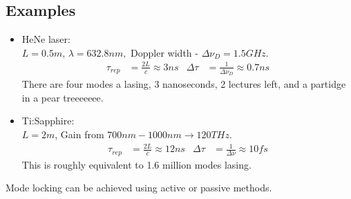 \documentclass[a4paper, 11pt, normalem]{report}
\begin{document}
\subsection{Examples}
\begin{itemize}
    \item HeNe laser:\\
        $L=0.5m,\,\lambda = 632.8nm,$ Doppler width - $\Delta\nu_D = 1.5GHz$.
        \begin{align}
            \tau_{rep} &= \frac{2L}{c} \approx 3ns &
            \Delta\tau &= \frac{1}{\Delta\nu_D} \approx 0.7ns
        \end{align}
        There are four modes a lasing, 3 nanoseconds, 2 lectures left, and a partidge in a pear treeeeeee. 
    \item Ti:Sapphire:\\
        $L=2m$, Gain from $700nm-1000nm \to 120 THz$.
        \begin{align}
            \tau_{rep} &= \frac{2L}{c} \approx 12ns &
            \Delta\tau &= \frac{1}{\Delta\nu} \approx 10fs
        \end{align}
        This is roughly equivalent to 1.6 million modes lasing.
\end{itemize}
Mode locking can be achieved using active or passive methods. 
\end{document}
